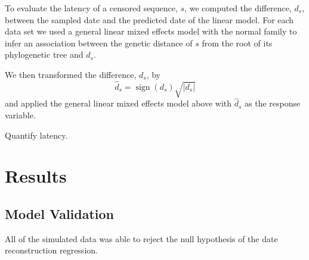 \documentclass[12pt]{article}
\begin{document}
To evaluate the latency of a censored sequence, $s$, we computed the difference, $d_s$, between the sampled date and the predicted date of the linear model. For each data set we used a general linear mixed effects model with the normal family to infer an association between the genetic distance of $s$ from the root of its phylogenetic tree and $d_s$.

We then transformed the difference, $d_s$, by
\[\hat{d}_s = \operatorname{sign}(d_s)\sqrt{|d_s|}\]
and applied the general linear mixed effects model above with $\hat{d}_s$ as the response variable.

Quantify latency.

\section * {Results} \label{sec:results}


\subsection * {Model Validation} \label{sec:sim_results}
All of the simulated data was able to reject the null hypothesis of the date reconstruction regression.


\end{document}
